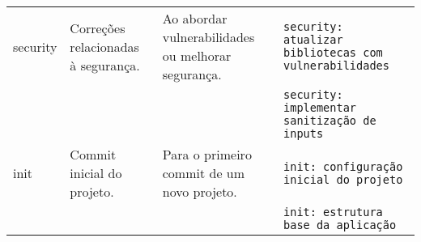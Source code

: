 \begin{longtable}{|p{}|p{}|p{}|p{}|}
  security & 
  Correções relacionadas à segurança. &
  Ao abordar vulnerabilidades ou melhorar segurança. &
  \texttt{security: atualizar bibliotecas com vulnerabilidades} \\
  & & & \texttt{security: implementar sanitização de inputs} \\
  \hline

  init & 
  Commit inicial do projeto. &
  Para o primeiro commit de um novo projeto. &
  \texttt{init: configuração inicial do projeto} \\
  & & & \texttt{init: estrutura base da aplicação} \\
  \hline
\end{longtable}